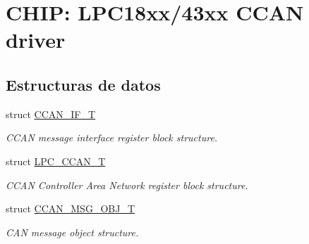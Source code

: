 \hypertarget{group___c_c_a_n__18_x_x__43_x_x}{}\section{C\+H\+IP\+: L\+P\+C18xx/43xx C\+C\+AN driver}
\label{group___c_c_a_n__18_x_x__43_x_x}
\subsection*{Estructuras de datos}
\begin{DoxyCompactItemize}
\item 
struct \hyperlink{struct_c_c_a_n___i_f___t}{C\+C\+A\+N\+\_\+\+I\+F\+\_\+T}
\begin{DoxyCompactList}\small\item\em C\+C\+AN message interface register block structure. \end{DoxyCompactList}\item 
struct \hyperlink{struct_l_p_c___c_c_a_n___t}{L\+P\+C\+\_\+\+C\+C\+A\+N\+\_\+T}
\begin{DoxyCompactList}\small\item\em C\+C\+AN Controller Area Network register block structure. \end{DoxyCompactList}\item 
struct \hyperlink{struct_c_c_a_n___m_s_g___o_b_j___t}{C\+C\+A\+N\+\_\+\+M\+S\+G\+\_\+\+O\+B\+J\+\_\+T}
\begin{DoxyCompactList}\small\item\em C\+AN message object structure. \end{DoxyCompactList}\end{DoxyCompactItemize}
